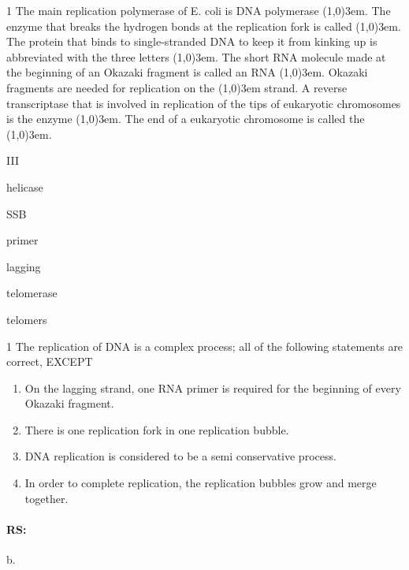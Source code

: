 \documentclass[\mainfilename]{subfiles}
\begin{document}
\begin{questionBox}1{ %
    The main replication polymerase of E. coli is DNA polymerase \line(1,0){3em}. The enzyme that breaks the hydrogen bonds at the replication fork is called  \line(1,0){3em}. The protein that binds to single-stranded DNA to keep it from kinking up is abbreviated with the three letters  \line(1,0){3em}. The short RNA molecule made at the beginning of an Okazaki fragment is called an RNA  \line(1,0){3em}. Okazaki fragments are needed for replication on the  \line(1,0){3em} strand. A reverse transcriptase that is involved in replication of the tips of eukaryotic chromosomes is the enzyme  \line(1,0){3em}. The end of a eukaryotic chromosome is called the \line(1,0){3em}.
} %
    \begin{enumerate}[label=\arabic{enumi}]
        \begin{multicols}{4}
            \item III
            \item helicase
            \item SSB
            \item primer
            \item lagging
            \item telomerase
            \item telomers
        \end{multicols}
    \end{enumerate}
\end{questionBox}

\begin{questionBox}1{ %
    The replication of DNA is a complex process; all of the following statements are correct, EXCEPT
} %
    \begin{enumerate}
        \item On the lagging strand, one RNA primer is required for the beginning of every Okazaki fragment.
        \item There is one replication fork in one replication bubble.
        \item DNA replication is considered to be a semi conservative process.
        \item In order to complete replication, the replication bubbles grow and merge together.
    \end{enumerate}
    \paragraph*{RS:} b.
\end{questionBox}
\end{document}
